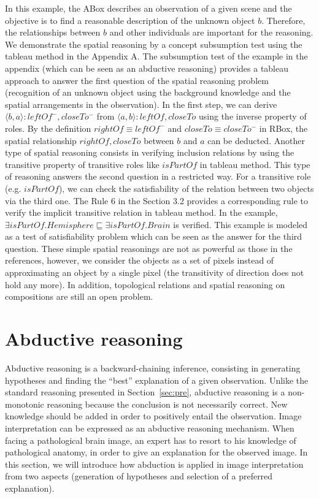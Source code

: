 \documentclass{article}
\begin{document}
In this example, the ABox describes an observation of a given scene and the objective is to find a reasonable description of  the unknown object $b$.
Therefore, the relationships between $b$ and other individuals are important for the reasoning. 
We demonstrate the spatial reasoning by a concept subsumption test using the tableau method in the Appendix A.
The subsumption test of the example in the appendix (which can be seen as an abductive reasoning) provides a tableau approach to answer the first question of the spatial reasoning
problem (recognition of an unknown object using the background knowledge and the spatial arrangements in the observation).
In the first step, we can derive $\langle b,a\rangle:leftOf^-,closeTo^-$ from $\langle a,b\rangle:leftOf,closeTo$ using the inverse property of roles.
By the definition $rightOf\equiv leftOf^-$ and $closeTo\equiv closeTo^-$ in RBox, the spatial relationship $rightOf,closeTo$ between $b$ and $a$ can be deducted.
Another type of spatial reasoning consists in verifying inclusion relations by using the transitive property of transitive roles like $isPartOf$ in tableau method. 
This type of reasoning answers the second question in a restricted way. For a transitive role (e.g. $isPartOf$), we can check the satisfiability of the relation
between two objects via the third one. The Rule 6 in the Section 3.2 provides a corresponding rule to verify the implicit transitive relation in tableau method. 
In the example, $\exists isPartOf. Hemisphere \sqsubseteq \exists isPartOf.Brain$ is verified.
This example is modeled as a test of satisfiability problem which can be seen as the answer for the third question.
These simple spatial reasonings are not as powerful as those in the references, however, we consider the objects as a set of pixels instead of approximating an object by a single pixel 
(the transitivity of direction does not hold any more).
In addition, topological relations and spatial reasoning on compositions are still an open problem.

\section{Abductive reasoning}\label{sec:abd}
Abductive reasoning is a backward-chaining inference, consisting in generating hypotheses and finding the ``best'' explanation of a given observation.
Unlike the standard reasoning presented in Section~\ref{sec:pre}, abductive reasoning is a non-monotonic reasoning because the conclusion is not necessarily correct.
New knowledge should be added in order to positively entail the observation.
Image interpretation can be expressed as an abductive reasoning  mechanism.
When facing a pathological brain image, an expert has to resort to his knowledge of pathological anatomy, in order to give  an explanation for the observed image. 
In this section, we will introduce how abduction is applied in image interpretation from two aspects (generation of hypotheses and selection of a preferred explanation).
\end{document}
